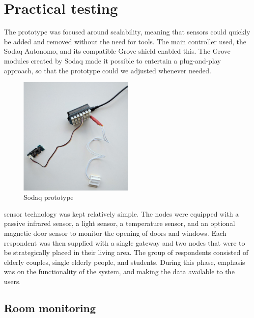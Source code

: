 \documentclass{below-ext}
\begin{document}
\section{Practical testing}
The prototype was focused around scalability, meaning that sensors could quickly be added and removed without the need for tools. The main controller used, the Sodaq Autonomo, and its compatible Grove shield enabled this. The Grove modules created by Sodaq made it possible to entertain a plug-and-play approach, so that the prototype could we adjusted whenever needed. 
\begin{figure}
\includegraphics[width=0.5\textwidth]{sodaq}
\caption{Sodaq prototype}
\label{fig:sodaq}
\end{figure}
sensor technology was kept relatively simple. The nodes were equipped with a passive infrared sensor, a light sensor, a temperature sensor, and an optional magnetic door sensor to monitor the opening of doors and windows. Each respondent was then supplied with a single gateway and two nodes that were to be strategically placed in their living area. The group of respondents consisted of elderly couples, single elderly people, and students. During this phase, emphasis was on the functionality of the system, and making the data available to the users. 

\subsection{Room monitoring}
\end{document}
